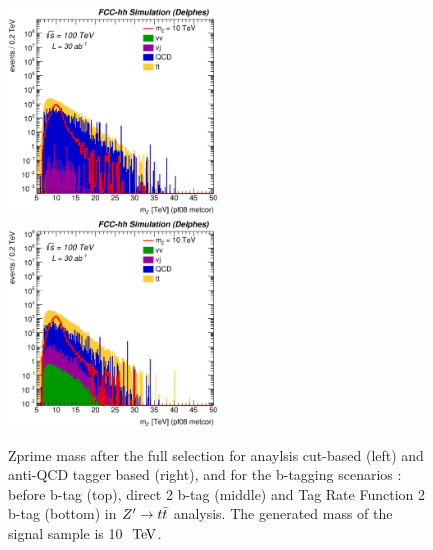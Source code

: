 \documentclass{cernrep}
\begin{document}
\begin{figure}[!htb]
\includegraphics[width=0.495\textwidth]{Fig/Zptt/Mj1j2_pf08_MetCorr_sel7_nostack_log.eps}
\includegraphics[width=0.495\textwidth]{Fig/Zptt/Mj1j2_pf08_MetCorr_sel8_nostack_log.eps}
\caption{Zprime mass after the full selection for anaylsis cut-based (left) and anti-QCD tagger based (right), and for the b-tagging scenarios : before b-tag (top), direct 2 b-tag (middle) and Tag Rate Function 2 b-tag (bottom) in $Z^{\prime} \rightarrow t\bar{t}$ analysis. The generated mass of the signal sample is 10 $\TeV$.}
\label{fig:Zptt_mass_sel_final}
\end{figure}
\end{document}

